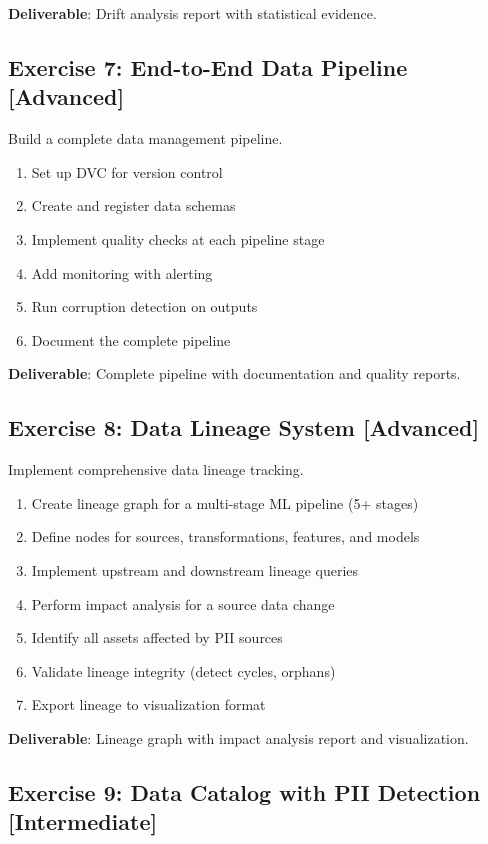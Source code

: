 \textbf{Deliverable}: Drift analysis report with statistical evidence.

\subsection{Exercise 7: End-to-End Data Pipeline [Advanced]}

Build a complete data management pipeline.

\begin{enumerate}
    \item Set up DVC for version control
    \item Create and register data schemas
    \item Implement quality checks at each pipeline stage
    \item Add monitoring with alerting
    \item Run corruption detection on outputs
    \item Document the complete pipeline
\end{enumerate}

\textbf{Deliverable}: Complete pipeline with documentation and quality reports.

\subsection{Exercise 8: Data Lineage System [Advanced]}

Implement comprehensive data lineage tracking.

\begin{enumerate}
    \item Create lineage graph for a multi-stage ML pipeline (5+ stages)
    \item Define nodes for sources, transformations, features, and models
    \item Implement upstream and downstream lineage queries
    \item Perform impact analysis for a source data change
    \item Identify all assets affected by PII sources
    \item Validate lineage integrity (detect cycles, orphans)
    \item Export lineage to visualization format
\end{enumerate}

\textbf{Deliverable}: Lineage graph with impact analysis report and visualization.

\subsection{Exercise 9: Data Catalog with PII Detection [Intermediate]}

